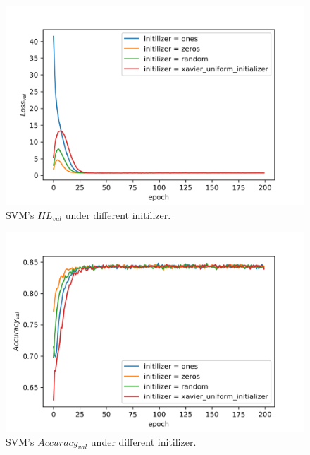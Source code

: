 \documentclass[journal, a4paper]{IEEEtran}
\begin{document}
\begin{figure}[!hbt]
	\begin{center}
		\includegraphics[width=\columnwidth]{svm_init_val_loss}
		\caption{SVM's $HL_{val}$ under different initilizer.}
		\label{fig:svm_init_val_loss}
	\end{center}
\end{figure} \par

\begin{figure}[!hbt]
	\begin{center}
		\includegraphics[width=\columnwidth]{svm_init_val_acc}
		\caption{SVM's $Accuracy_{val}$ under different initilizer.}
		\label{fig:svm_init_val_acc}
	\end{center}
\end{figure} \par
\end{document}
